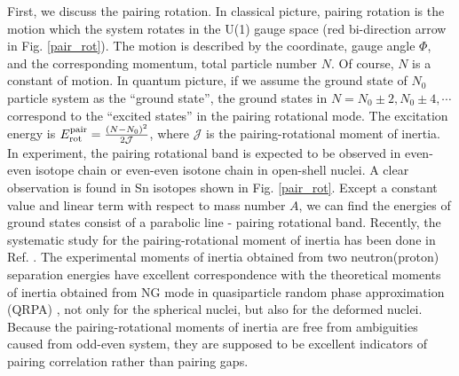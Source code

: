\documentclass[11pt]{book} %
\begin{document}
First, we discuss the pairing rotation. In classical picture, pairing rotation is the motion which the system rotates in the U(1) gauge space (red bi-direction arrow in Fig. \ref{pair_rot}). The motion is described by the coordinate, gauge angle $\Phi$, and the corresponding momentum, total particle number $N$. 
Of course, $N$ is a constant of motion. In quantum picture, if we assume the ground state of $N_0$ particle system as the ``ground state'', the ground states in $N=N_0\pm2, N_0\pm4,\cdots$ correspond to the ``excited states'' in the pairing rotational mode. The excitation energy is $E_{\rm rot}^{\rm pair}=\frac{(N-N_0)^2}{2\mathcal{J}}$, where $\mathcal{J}$ is the pairing-rotational moment of inertia. In experiment, the pairing rotational band is expected to be observed in even-even isotope chain or even-even isotone chain in open-shell nuclei. A clear observation is found in Sn isotopes shown in Fig. \ref{pair_rot}. Except a constant value and linear term with respect to mass number $A$, we can find the energies of ground states consist of a parabolic line - pairing rotational band. Recently, the systematic study for the pairing-rotational moment of inertia has been done in Ref. \cite{HN16}. The experimental moments of inertia obtained from two neutron(proton) separation energies have excellent correspondence with the theoretical moments of inertia obtained from NG mode in quasiparticle random phase approximation (QRPA) \cite{TV61}, not only for the spherical nuclei, but also for the deformed nuclei. Because the pairing-rotational moments of inertia are free from ambiguities caused from odd-even system, they are supposed to be excellent indicators of pairing correlation rather than pairing gaps.
\end{document}
